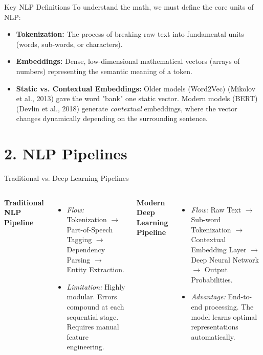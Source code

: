 \documentclass[aspectratio=169]{beamer}
\begin{document}
	\begin{frame}{Key NLP Definitions}
		To understand the math, we must define the core units of NLP:
		\begin{itemize}
			\item \textbf{Tokenization:} The process of breaking raw text into fundamental units (words, sub-words, or characters).
			\item \textbf{Embeddings:} Dense, low-dimensional mathematical vectors (arrays of numbers) representing the semantic meaning of a token.
			\item \textbf{Static vs. Contextual Embeddings:} Older models (Word2Vec) (Mikolov et al., 2013) gave the word "bank" one static vector. Modern models (BERT) (Devlin et al., 2018) generate \textit{contextual} embeddings, where the vector changes dynamically depending on the surrounding sentence.
		\end{itemize}
	\end{frame}
	
	\section{2. NLP Pipelines}
	
	\begin{frame}{Traditional vs. Deep Learning Pipelines}
		\begin{columns}
			\textbf{Traditional NLP Pipeline}
			\begin{itemize}
				\item \textit{Flow:} Tokenization $\rightarrow$ Part-of-Speech Tagging $\rightarrow$ Dependency Parsing $\rightarrow$ Entity Extraction.
				\item \textit{Limitation:} Highly modular. Errors compound at each sequential stage. Requires manual feature engineering.
			\end{itemize}
			
			\textbf{Modern Deep Learning Pipeline}
			\begin{itemize}
				\item \textit{Flow:} Raw Text $\rightarrow$ Sub-word Tokenization $\rightarrow$ Contextual Embedding Layer $\rightarrow$ Deep Neural Network $\rightarrow$ Output Probabilities.
				\item \textit{Advantage:} End-to-end processing. The model learns optimal representations automatically.
			\end{itemize}
		\end{columns}
	\end{frame}
	
\end{document}
